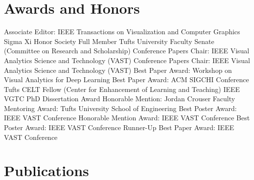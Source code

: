 \documentclass[10pt, letterpaper]{moderncv}
\begin{document}
\section{Awards and Honors}
 {Associate Editor: IEEE Transactions on Visualization and Computer Graphics}
 {Sigma Xi Honor Society Full Member}
{Tufts University Faculty Senate (Committee on Research and Scholarship)}
{Conference Papers Chair: IEEE Visual Analytics Science and Technology (VAST)}
{Conference Papers Chair: IEEE Visual Analytics Science and Technology (VAST)}
{Best Paper Award: Workshop on Visual Analytics for Deep Learning}
{Best Paper Award: ACM SIGCHI Conference}
{Tufts CELT Fellow (Center for Enhancement of Learning and Teaching)}
{IEEE VGTC PhD Dissertation Award Honorable Mention: Jordan Crouser}
{Faculty Mentoring Award: Tufts University School of Engineering}
{Best Poster Award: IEEE VAST Conference}
{Honorable Mention Award: IEEE VAST Conference}
{Best Poster Award: IEEE VAST Conference}
{Runner-Up Best Paper Award: IEEE VAST Conference}
\closesection{}


\section{Publications}
\closesection{}%
\vspace*{-1.65em}%
\end{document}

